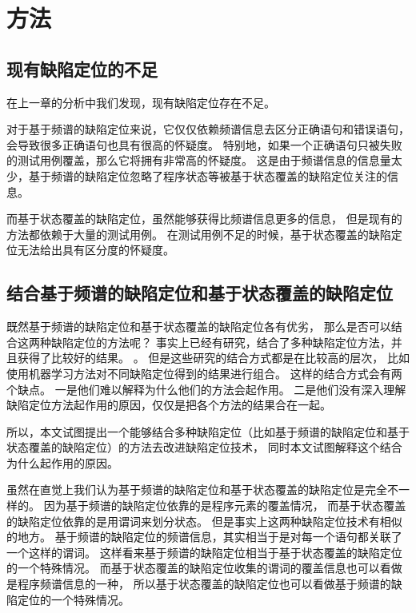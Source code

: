 \chapter{方法}

\section{现有缺陷定位的不足}

在上一章的分析中我们发现，现有缺陷定位存在不足。

对于基于频谱的缺陷定位来说，它仅仅依赖频谱信息去区分正确语句和错误语句，
会导致很多正确语句也具有很高的怀疑度。
特别地，如果一个正确语句只被失败的测试用例覆盖，那么它将拥有非常高的怀疑度。
这是由于频谱信息的信息量太少，基于频谱的缺陷定位忽略了程序状态等被基于状态覆盖的缺陷定位关注的信息。

而基于状态覆盖的缺陷定位，虽然能够获得比频谱信息更多的信息，
但是现有的方法都依赖于大量的测试用例。
在测试用例不足的时候，基于状态覆盖的缺陷定位无法给出具有区分度的怀疑度。

\section{结合基于频谱的缺陷定位和基于状态覆盖的缺陷定位}

既然基于频谱的缺陷定位和基于状态覆盖的缺陷定位各有优劣，
那么是否可以结合这两种缺陷定位的方法呢？
事实上已经有研究\parencite{Le2016A,Xuan2014Learning}，结合了多种缺陷定位方法，并且获得了比较好的结果。
。
但是这些研究的结合方式都是在比较高的层次，
比如使用机器学习方法对不同缺陷定位得到的结果进行组合。
这样的结合方式会有两个缺点。
一是他们难以解释为什么他们的方法会起作用。
二是他们没有深入理解缺陷定位方法起作用的原因，仅仅是把各个方法的结果合在一起。

所以，本文试图提出一个能够结合多种缺陷定位（比如基于频谱的缺陷定位和基于状态覆盖的缺陷定位）的方法去改进缺陷定位技术，
同时本文试图解释这个结合为什么起作用的原因。

虽然在直觉上我们认为基于频谱的缺陷定位和基于状态覆盖的缺陷定位是完全不一样的。
因为基于频谱的缺陷定位依靠的是程序元素的覆盖情况，
而基于状态覆盖的缺陷定位依靠的是用谓词来划分状态。
但是事实上这两种缺陷定位技术有相似的地方。
基于频谱的缺陷定位的频谱信息，其实相当于是对每一个语句都关联了一个这样的谓词。
这样看来基于频谱的缺陷定位相当于基于状态覆盖的缺陷定位的一个特殊情况。
而基于状态覆盖的缺陷定位收集的谓词的覆盖信息也可以看做是程序频谱信息的一种，
所以基于状态覆盖的缺陷定位也可以看做基于频谱的缺陷定位的一个特殊情况。


